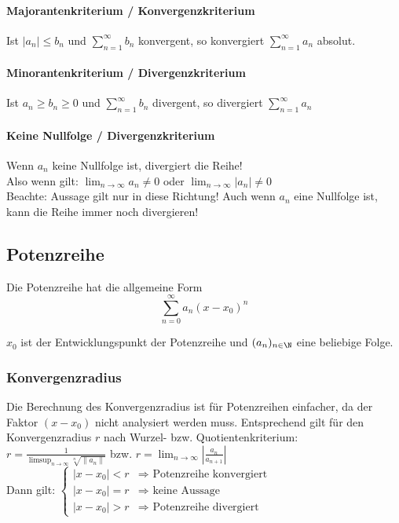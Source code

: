 \paragraph{Majorantenkriterium / Konvergenzkriterium}
\vspace{-0.2cm}
Ist $|a_n| \leq b_n$ und $\sum_{n=1}^\infty b_n$ konvergent, so konvergiert
$\sum_{n=1}^\infty a_n$ absolut.

\paragraph{Minorantenkriterium / Divergenzkriterium}
\vspace{-0.2cm}
Ist $a_n \geq b_n \geq 0$ und $\sum_{n=1}^\infty b_n$ divergent, so divergiert
$\sum_{n=1}^\infty a_n$
\pagebreak
\paragraph{Keine Nullfolge / Divergenzkriterium}
\vspace{-0.2cm}
Wenn $a_n$ keine Nullfolge ist, divergiert die Reihe! \\
Also wenn gilt: $\lim_{n \to \infty} a_n \neq 0$ oder $\lim_{n \to \infty} |a_n| \neq 0$ \\
Beachte: Aussage gilt nur in diese Richtung! Auch wenn $a_n$ eine Nullfolge ist, kann die Reihe immer noch divergieren!

\subsection{Potenzreihe}
\vspace{-0.2cm}
Die Potenzreihe hat die allgemeine Form
\[
\sum_{n=0}^\infty a_n (x - x_0)^n
\]

$x_0$ ist der Entwicklungspunkt der Potenzreihe und $(a_n)_{n \in \N}$ eine
beliebige Folge.

\subsubsection{Konvergenzradius}
\vspace{-0.2cm}
Die Berechnung des Konvergenzradius ist für Potenzreihen einfacher, da der
Faktor $(x - x_0)$ nicht analysiert werden muss. Entsprechend gilt für den
Konvergenzradius $r$ nach Wurzel- bzw. Quotientenkriterium:\\
$r = \frac{1}{\limsup_{n\to\infty} \sqrt[n]{\|a_n\|}}$ bzw.
$r = \lim_{n\to\infty} \left | \frac{a_n}{a_{n+1}} \right |$ \\
Dann gilt:
$
\begin{cases}
	|x - x_0| < r & \Rightarrow \text{ Potenzreihe konvergiert} \\
	|x - x_0| = r & \Rightarrow \text{ keine Aussage}\\
	|x - x_0| > r & \Rightarrow \text{ Potenzreihe divergiert}
\end{cases}
$

